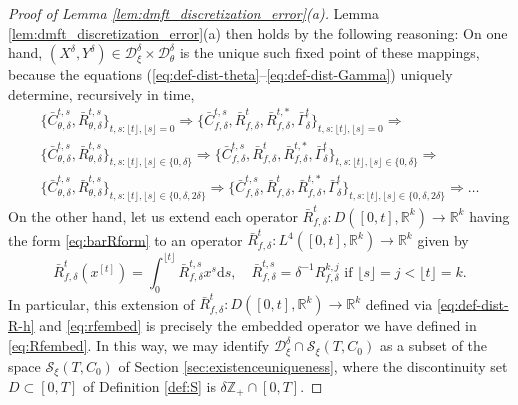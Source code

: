 \documentclass[11pt,letterpaper,reqno]{amsart}
\theoremstyle{definition}
\def\d{\mathrm{d}}
\def\Z{\mathbb{Z}}
\def\R{\mathbb{R}}
\def\cS{\mathcal{S}}
\def\cD{\mathcal{D}}
\newcommand{\flr}[1]{{\lfloor {#1} \rfloor}}
\begin{document}
\begin{proof}[Proof of Lemma \ref{lem:dmft_discretization_error}(a)]
Lemma \ref{lem:dmft_discretization_error}(a) then holds by the following
reasoning: On one hand, $(X^\delta,Y^\delta) \in \cD_\xi^\delta \times
\cD_\theta^\delta$ is the unique such
fixed point of these mappings, because the equations
(\ref{eq:def-dist-theta}--\ref{eq:def-dist-Gamma}) uniquely determine,
recursively in time,
\[\begin{gathered}
\{\bar C_{\theta,\delta}^{t,s},\bar R_{\theta,\delta}^{t,s}\}_{t,s:\flr{t},\flr{s}=0}
\Rightarrow
\{\bar C_{f,\delta}^{t,s},\bar
R_{f,\delta}^t,\bar R_{f,\delta}^{t,*},\bar \Gamma_\delta^t\}_{t,s:\flr{t},\flr{s}=0}
\Rightarrow\\
\{\bar C_{\theta,\delta}^{t,s},\bar
R_{\theta,\delta}^{t,s}\}_{t,s:\flr{t},\flr{s} \in \{0,\delta\}}
\Rightarrow
\{\bar C_{f,\delta}^{t,s},\bar
R_{f,\delta}^t,\bar R_{f,\delta}^{t,*},\bar \Gamma_\delta^t\}_{t,s:\flr{t},\flr{s} \in \{0,\delta\}} \Rightarrow\\
\{\bar C_{\theta,\delta}^{t,s},\bar
R_{\theta,\delta}^{t,s}\}_{t,s:\flr{t},\flr{s} \in \{0,\delta,2\delta\}}
\Rightarrow \{\bar C_{f,\delta}^{t,s},\bar
R_{f,\delta}^t,\bar R_{f,\delta}^{t,*},\bar
\Gamma_\delta^t\}_{t,s:\flr{t},\flr{s} \in \{0,\delta,2\delta\}} \Rightarrow
\ldots
\end{gathered}\]
On the other hand, let us extend each operator
$\bar R_{f,\delta}^t:D([0,t],\R^k) \to \R^k$ having the form
\eqref{eq:barRform} to an operator
$\bar R_{f,\delta}^t:L^4([0,t],\R^k) \to \R^k$ given by
\[\bar R_{f,\delta}^t(x^{[t]})=\int_0^{\flr{t}} \bar R_{f,\delta}^{t,s}x^s\d s,
\quad \bar R_{f,\delta}^{t,s}=\delta^{-1}R_{f,\delta}^{k,j} \text{ if }
\flr{s}=j<\flr{t}=k.\]
In particular, this extension of $\bar R_{f,\delta}^t:D([0,t],\R^k) \to \R^k$
defined via \eqref{eq:def-dist-R-h} and
\eqref{eq:rfembed} is precisely the embedded operator we have defined in
\eqref{eq:Rfembed}. In this way,
we may identify $\cD_\xi^\delta \cap \cS_\xi(T,C_0)$ as a subset of the
space $\cS_\xi(T,C_0)$ of Section \ref{sec:existenceuniqueness}, where the
discontinuity set $D \subset [0,T]$ of Definition \ref{def:S}
is $\delta\Z_+ \cap [0,T]$.


\end{proof}
\end{document}

